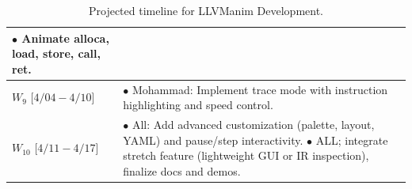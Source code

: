 \begin{table}[htbp]
\begin{tabularx}{\columnwidth}{|>{\centering\arraybackslash}m{2.5cm}|>{\raggedright\arraybackslash}X|}
                           $\bullet$ Animate alloca, load, store, call, ret. \\ \hline
$W_9$    [$4/04 - 4/10$] & $\bullet$ Mohammad: Implement trace mode with instruction highlighting and speed control. \\
$W_{10}$ [$4/11 - 4/17$] & $\bullet$ All: Add advanced customization (palette, layout, YAML) and pause/step interactivity. \newline
                           $\bullet$ ALL; integrate stretch feature (lightweight GUI or IR inspection), finalize docs and demos. \\ \hline
\end{tabularx}
\vspace{0.1cm}
\caption{Projected timeline for LLVManim Development.}
\end{table}
